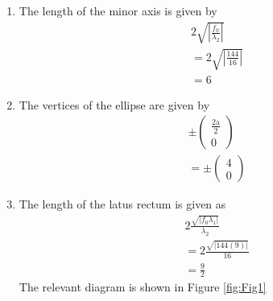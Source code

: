 \documentclass[12pt]{article}
\providecommand{\brak}[1]{\ensuremath{\left(#1\right)}}
\providecommand{\abs}[1]{\left\vert#1\right\vert}
\newcommand{\myvec}[1]{\ensuremath{\begin{pmatrix}#1\end{pmatrix}}}
\begin{document}
\begin{enumerate}
\begin{enumerate}
\item  The length of the minor axis is given by
\begin{align}
	\label{eq:minorLength}
	& 2\sqrt{\abs{\frac{f_0}{\lambda_2}}}\\
	&= 2\sqrt{\abs{\frac{144}{16}}}\\
	&= 6
\end{align}
\item The vertices of the ellipse are given by 
\begin{align}
	& \pm\myvec{\frac{\text{2a}}{2} \\ 0} \\
	&= \pm\myvec{4 \\ 0}
\end{align}
\item The length of the latus rectum is given as 
\begin{align}
	\label{eq:eqLatRectLen}
	& 2\frac{\sqrt{\abs{f_0\lambda_1}}}{\lambda_2} \\
	&= 2\frac{\sqrt{\abs{144\brak{9}}}}{16} \\
	&= \frac{9}{2}
\end{align}
The relevant diagram is shown in Figure \ref{fig:Fig1}

\end{enumerate}
\end{enumerate}
\end{document}
